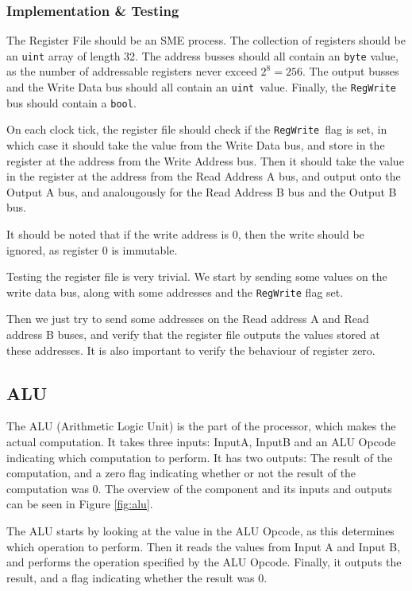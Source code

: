 \subsubsection*{Implementation \& Testing}
The Register File should be an SME process. The collection of registers should
be an \texttt{uint} array of length 32. The address busses should all contain
an \texttt{byte} value, as the number of addressable registers never exceed
$2^8=256$. The output busses and the Write Data bus should all contain an
\texttt{uint} value. Finally, the \texttt{RegWrite} bus should contain a
\texttt{bool}.

On each clock tick, the register file should check if the
\texttt{RegWrite} flag is set, in which case it should take the value from the
Write Data bus, and store in the register at the address from the Write Address
bus. Then it should take the value in the register at the address from the Read
Address A bus, and output onto the Output A bus, and analougously for the Read
Address B bus and the Output B bus.

It should be noted that if the write address is 0, then the write should be
ignored, as register 0 is immutable.

Testing the register file is very trivial. We start by sending some values
on the write data bus, along with some addresses and the \texttt{RegWrite}
flag set.

Then we just try to send some addresses on the Read address A and Read
address B buses, and verify that the register file outputs the values
stored at these addresses. It is also important to verify the behaviour of
register zero.

\subsection{ALU}
\label{sec:alu}
The ALU (Arithmetic Logic Unit) is the part of the processor, which makes the
actual computation. It takes three inputs: InputA, InputB and an ALU Opcode
indicating which computation to perform. It has two outputs: The result of the
computation, and a zero flag indicating whether or not the result of the
computation was 0. The overview of the component and its inputs and outputs can
be seen in Figure \ref{fig:alu}.

The ALU starts by looking at the value in the ALU Opcode, as this determines
which operation to perform. Then it reads the values from Input A and Input B,
and performs the operation specified by the ALU Opcode. Finally, it outputs the
result, and a flag indicating whether the result was 0.

